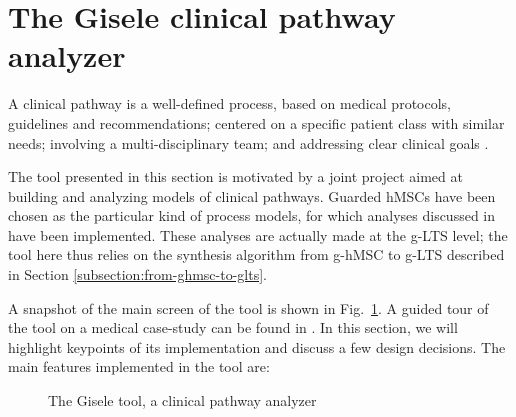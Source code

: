 \section{The Gisele clinical pathway analyzer\label{section:tool-clinical-pathway-analyzer}}

A clinical pathway is a well-defined process, based on medical protocols, guidelines and recommendations; centered on a specific patient class with similar needs; involving a multi-disciplinary team; and addressing clear clinical goals \cite{Middleton:2000}. 

The tool presented in this section is motivated by a joint project aimed at building and analyzing models of clinical pathways. Guarded hMSCs have been chosen as the particular kind of process models, for which analyses discussed in \cite{Damas:2011} have been implemented. These analyses are actually made at the g-LTS level; the tool here thus relies on the synthesis algorithm from g-hMSC to g-LTS described in Section \ref{subsection:from-ghmsc-to-glts}.

A snapshot of the main screen of the tool is shown in Fig.~\ref{image:gisele-tool}. A guided tour of the tool on a medical case-study can be found in \cite{Damas:2011}. In this section, we will highlight keypoints of its implementation and discuss a few design decisions. The main features implemented in the tool are:

\begin{figure}
\centering{}
  \caption{The Gisele tool, a clinical pathway analyzer\label{image:gisele-tool}}
\end{figure}

